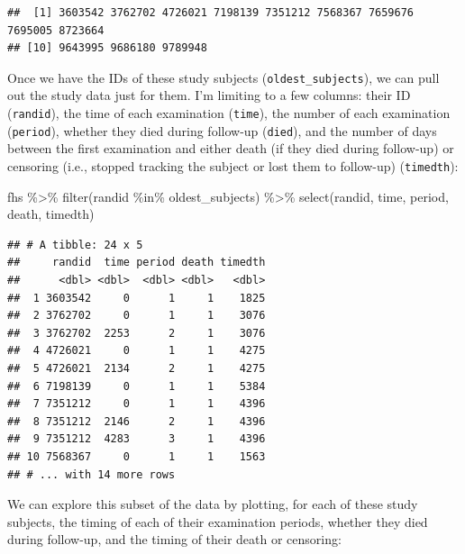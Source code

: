 \documentclass[
]{book}
\newenvironment{Shaded}{\begin{snugshade}}{\end{snugshade}}
\newcommand{\FunctionTok}[1]{\textcolor[rgb]{0.00,0.00,0.00}{#1}}
\newcommand{\NormalTok}[1]{#1}
\newcommand{\SpecialCharTok}[1]{\textcolor[rgb]{0.00,0.00,0.00}{#1}}
\begin{document}
\begin{verbatim}
##  [1] 3603542 3762702 4726021 7198139 7351212 7568367 7659676 7695005 8723664
## [10] 9643995 9686180 9789948
\end{verbatim}

Once we have the IDs of these study subjects (\texttt{oldest\_subjects}), we can pull out the study data just for them. I'm limiting to a few columns: their ID (\texttt{randid}), the time of each examination (\texttt{time}), the number of each examination (\texttt{period}), whether they died during follow-up (\texttt{died}), and the number of days between the first examination and either death (if they died during follow-up) or censoring (i.e., stopped tracking the subject or lost them to follow-up) (\texttt{timedth}):

\begin{Shaded}
\begin{Highlighting}[]
\NormalTok{fhs }\SpecialCharTok{\%\textgreater{}\%} 
  \FunctionTok{filter}\NormalTok{(randid }\SpecialCharTok{\%in\%}\NormalTok{ oldest\_subjects) }\SpecialCharTok{\%\textgreater{}\%} 
  \FunctionTok{select}\NormalTok{(randid, time, period, death, timedth)}
\end{Highlighting}
\end{Shaded}

\begin{verbatim}
## # A tibble: 24 x 5
##     randid  time period death timedth
##      <dbl> <dbl>  <dbl> <dbl>   <dbl>
##  1 3603542     0      1     1    1825
##  2 3762702     0      1     1    3076
##  3 3762702  2253      2     1    3076
##  4 4726021     0      1     1    4275
##  5 4726021  2134      2     1    4275
##  6 7198139     0      1     1    5384
##  7 7351212     0      1     1    4396
##  8 7351212  2146      2     1    4396
##  9 7351212  4283      3     1    4396
## 10 7568367     0      1     1    1563
## # ... with 14 more rows
\end{verbatim}

We can explore this subset of the data by plotting, for each of these study subjects, the timing of each of their examination periods, whether they died during follow-up, and the timing of their death or censoring:
\end{document}
